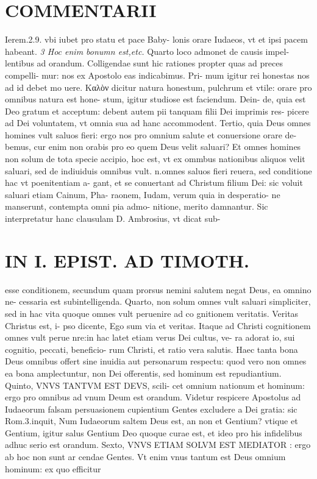 \documentclass{article}
\begin{document}
\begin{pages}
\section*{COMMENTARII }
\marginpar{[ p.48 ]}\pstart Ierem.2.9. vbi iubet pro statu et pace Baby- lonis orare Iudaeos, vt et ipsi pacem habeant.  \pend
\textit{3 Hoc enim bonumn est,etc. }\pstart Quarto loco admonet de causis impel- lentibus ad orandum. Colligendae sunt hic rationes propter quas ad preces compelli- mur: nos ex Apostolo eas indicabimus. Pri- mum igitur rei honestas nos ad id debet mo uere. Καλὸν dicitur natura honestum, pulchrum et vtile: orare pro omnibus natura est hone- stum, igitur studiose est faciendum. Dein- de, quia est Deo gratum et acceptum: debent autem pii tanquam filii Dei imprimis res- picere ad Dei voluntatem, vt omnia sua ad hanc accommodent. Tertio, quia Deus omnes homines vult saluos fieri: ergo nos pro omnium salute et conuersione orare de- bemus, cur enim non orabis pro eo quem Deus velit saluari? Et omnes homines non solum de tota specie accipio, hoc est, vt ex ommbus  nationibus  aliquos velit saluari, sed de indiuiduis omnibus  vult. n.omnes saluos fieri reuera, sed conditione hac vt poenitentiam a- gant, et se conuertant ad Christum filium Dei: sic voluit saluari etiam Cainum, Pha- raonem, Iudam, verum quia in desperatio- ne manserunt, contempta omni pia admo- nitione, merito damnantur. Sic interpretatur hanc clausulam D. Ambrosius, vt dicat sub-  \pend
\section*{IN I. EPIST. AD TIMOTH. }
\marginpar{[ p.49 ]}\pstart esse conditionem, secundum quam prorsus nemini salutem negat Deus, ea omnino ne- cessaria est subintelligenda. Quarto, non solum omnes vult saluari simpliciter, sed in hac vita quoque omnes vult peruenire ad co gnitionem veritatis. Veritas Christus est, i- pso dicente, Ego sum via et veritas. Itaque ad Christi cognitionem omnes vult perue nre:in hac latet etiam verus Dei cultus, ve- ra adorat io, sui cognitio, peccati, beneficio- rum Christi, et ratio vera salutis. Haec tanta bona Deus omnibus offert sine inuidia aut personarum respectu: quod vero non omnes ea bona amplectuntur, non Dei offerentis, sed hominum est repudiantium.  \pend\pstart Quinto, VNVS TANTVM EST DEVS, scili- cet omnium nationum et hominum: ergo pro omnibus ad vnum Deum est orandum. Videtur respicere Apostolus ad Iudaeorum falsam persuasionem cupientium Gentes excludere a Dei gratia: sic Rom.3.inquit, Num Iudaeorum saltem Deus est, an non et Gentium? vtique et Gentium, igitur salus Gentium Deo quoque curae est, et ideo pro his infidelibus adhuc serio est orandum. Sexto, VNVS ETIAM SOLVM EST MEDIATOR : ergo ab hoc non sunt ar cendae Gentes. Vt enim vnus tantum est Deus omnium hominum: ex quo efficitur  \pend

\end{pages}
\end{document}
